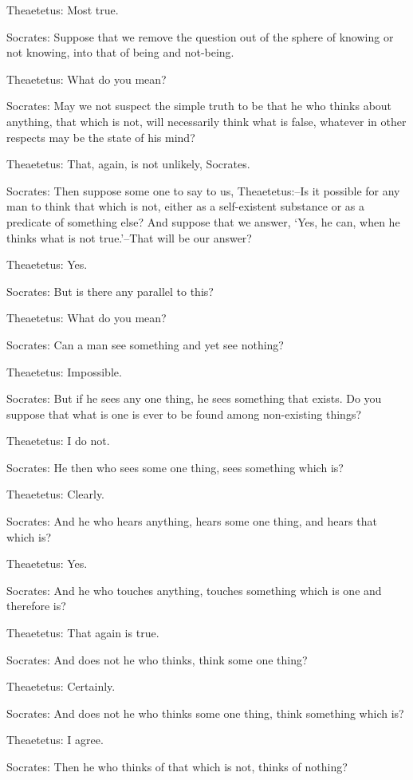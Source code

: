 Theaetetus: Most true.

Socrates: Suppose that we remove the question out of the sphere of
knowing or not knowing, into that of being and not-being.

Theaetetus: What do you mean?

Socrates: May we not suspect the simple truth to be that he who thinks
about anything, that which is not, will necessarily think what is false,
whatever in other respects may be the state of his mind?

Theaetetus: That, again, is not unlikely, Socrates.

Socrates: Then suppose some one to say to us, Theaetetus:--Is
it possible for any man to think that which is not, either as a
self-existent substance or as a predicate of something else? And suppose
that we answer, `Yes, he can, when he thinks what is not true.'--That
will be our answer?

Theaetetus: Yes.

Socrates: But is there any parallel to this?

Theaetetus: What do you mean?

Socrates: Can a man see something and yet see nothing?

Theaetetus: Impossible.

Socrates: But if he sees any one thing, he sees something that exists.
Do you suppose that what is one is ever to be found among non-existing
things?

Theaetetus: I do not.

Socrates: He then who sees some one thing, sees something which is?

Theaetetus: Clearly.

Socrates: And he who hears anything, hears some one thing, and hears
that which is?

Theaetetus: Yes.

Socrates: And he who touches anything, touches something which is one
and therefore is?

Theaetetus: That again is true.

Socrates: And does not he who thinks, think some one thing?

Theaetetus: Certainly.

Socrates: And does not he who thinks some one thing, think something
which is?

Theaetetus: I agree.

Socrates: Then he who thinks of that which is not, thinks of nothing?

